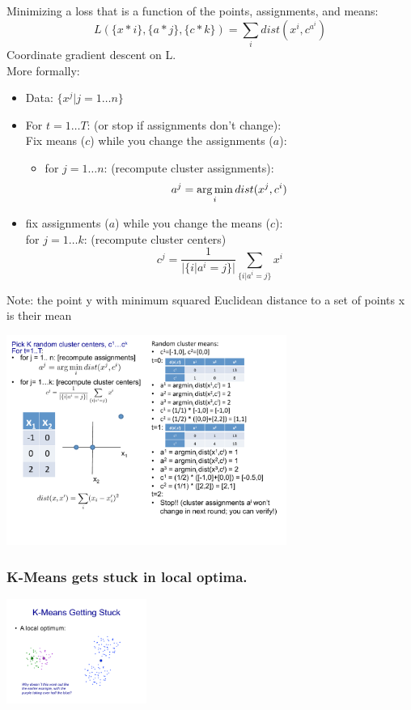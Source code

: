 Minimizing a loss that is a function of the points, assignments, and means:
$$ L( \{ x*i \},  \{ a*j \},   \{ c*k \}) = \sum_i dist(x^i, c^{a^i})$$
Coordinate gradient descent on L.  \hfill \\

More formally: 
\begin{itemize}
	\item Data: $\{ x^j | j = 1 \dots n \}$
	\item For $ t = 1 \dots T$:  (or stop if assignments don't change): \hfill \\
		Fix means ($c$) while you change the assignments ($a$): \hfill \\
		\begin{itemize}
			\item for $ j = 1 \dots n$: (recompute cluster assignments):
				$$ a^j = \operatorname*{arg\,min}_i dist(x^j, c^i)  $$ 
		\end{itemize}
	\item fix assignments ($a$) while you change the means ($c$): \hfill \\
		for $j = 1 \dots k$: (recompute cluster centers)
		$$ c^j = \frac{1}{|\{ i | a^i = j \}|}  \sum_{\{ i | a^i = j \}} x^i$$
\end{itemize}
Note:  the point y with minimum squared Euclidean distance to a set of points {x} is their mean

\includegraphics[width=3.6in]{figures/kmeans_algorithm_example.pdf}

\subsubsection{K-Means gets stuck in local optima.}

\includegraphics[width=1.8in]{figures/k-means_gets_stuck.pdf}

